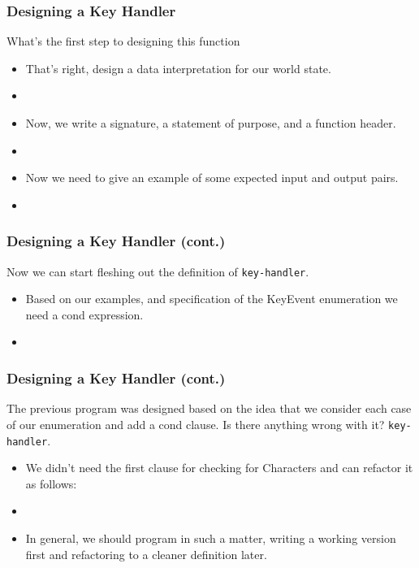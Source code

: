 \documentclass{beamer}
\begin{document}
\begin{frame}
  \frametitle{Designing a Key Handler}
  What's the first step to designing this function
  \begin{itemize}
  \item<2->That's right, design a data interpretation for our world state.
  \item<3-> \keInterp
  \item<4-> Now, we write a signature, a statement of purpose, and a 
    function header.
  \item<5-> \keHeader
  \item<6-> Now we need to give an example of some expected input and output pairs.
  \item<7-> \keTests
  \end{itemize}
\end{frame}


\begin{frame}
  \frametitle{Designing a Key Handler (cont.)}
  Now we can start fleshing out the definition of \texttt{key-handler}.
  \begin{itemize}
  \item<2-> Based on our examples, and specification of
    the KeyEvent enumeration we need a cond expression.
  \item<3-> \keDef
  \end{itemize}
\end{frame}


\begin{frame}
  \frametitle{Designing a Key Handler (cont.)}
  The previous program was designed based on the idea that we
  consider each case of our enumeration and add a cond clause.
  Is there anything wrong with it?
  \texttt{key-handler}.
  \begin{itemize}
  \item<2-> We didn't need the first clause for checking for Characters
    and can refactor it as follows:
  \item<3-> \keNew
  \item<4-> In general, we should program in such a matter, writing
    a working version first and refactoring to a cleaner definition later.
  \end{itemize}
\end{frame}
\end{document}
